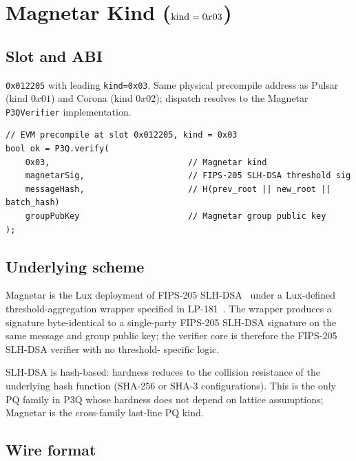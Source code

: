 \section{Magnetar Kind ($\textnormal{kind} = 0x03$)}
\label{sec:magnetar-kind}

\subsection{Slot and ABI}

\texttt{0x012205} with leading \texttt{kind=0x03}. Same physical
precompile address as Pulsar (kind $0x01$) and Corona
(kind $0x02$); dispatch resolves to the Magnetar
\texttt{P3QVerifier} implementation.

\begin{lstlisting}[language={}]
// EVM precompile at slot 0x012205, kind = 0x03
bool ok = P3Q.verify(
    0x03,                            // Magnetar kind
    magnetarSig,                     // FIPS-205 SLH-DSA threshold sig
    messageHash,                     // H(prev_root || new_root || batch_hash)
    groupPubKey                      // Magnetar group public key
);
\end{lstlisting}

\subsection{Underlying scheme}

Magnetar is the Lux deployment of FIPS-205 SLH-DSA~\cite{fips205}
under a Lux-defined threshold-aggregation wrapper specified in
LP-181~\cite{lp181}. The wrapper produces a signature
byte-identical to a single-party FIPS-205 SLH-DSA signature on
the same message and group public key; the verifier core is
therefore the FIPS-205 SLH-DSA verifier with no threshold-
specific logic.

SLH-DSA is hash-based: hardness reduces to the collision
resistance of the underlying hash function (SHA-256 or SHA-3
configurations). This is the only PQ family in P3Q whose
hardness does not depend on lattice assumptions; Magnetar is
the cross-family last-line PQ kind.

\subsection{Wire format}

